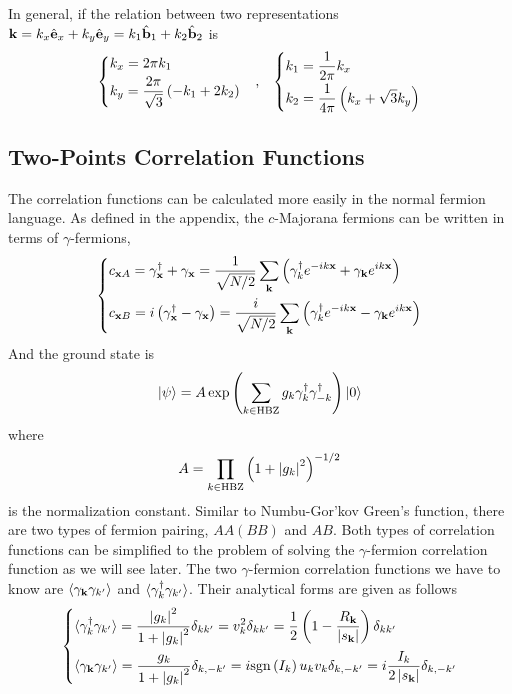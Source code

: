 In general, if the relation between two representations $\mathbf{k} = k_x\hat{\mathbf{e}}_x + k_y\hat{\mathbf{e}}_y = k_1\hat{\mathbf{b}}_1 + k_2\hat{\mathbf{b}}_2$ is
\[
\begin{array}{ccc}
    \left\{
    \begin{aligned}
        & k_x = 2\pi k_1 \\
        & k_y = \frac{2\pi}{\sqrt{3}}\left( -k_1 + 2k_2 \right)
    \end{aligned}
    \right.
    &  
    ,
    &
    \left\{
    \begin{aligned}
        & k_1 = \frac{1}{2\pi} k_x \\
        & k_2 = \frac{1}{4\pi}\left( k_x + \sqrt{3}k_y \right)
    \end{aligned}
    \right.
\end{array}
\]


\subsection{Two-Points Correlation Functions}
The correlation functions can be calculated more easily in the normal fermion language. As defined in the appendix, the $c$-Majorana fermions can be written in terms of $\gamma$-fermions,
\[
\left\{
\begin{aligned}
& c_{\mathbf{x}A} =  \gamma^\dagger_{\mathbf{x}} + \gamma_{\mathbf{x}} = \frac{1}{\sqrt{N/2}}\sum_{\mathbf{k}}\left( \gamma^\dagger_k e^{-ik\mathbf{x}} + \gamma_{\mathbf{k}} e^{ik\mathbf{x}} \right) \\
& c_{\mathbf{x}B} = i\left( \gamma^\dagger_{\mathbf{x}} - \gamma_{\mathbf{x}} \right) = \frac{i}{\sqrt{N/2}}\sum_{\mathbf{k}}\left( \gamma^\dagger_k e^{-ik\mathbf{x}} - \gamma_{\mathbf{k}} e^{ik\mathbf{x}} \right)
\end{aligned}
\right.
\]
And the ground state is 
\[
| \psi \rangle = A\exp\left( \sum_{k\in\mathrm{HBZ}}g_k\gamma^\dagger_k\gamma^\dagger_{-k} \right) | 0 \rangle
\]
where 
\[
A = \prod_{k\in\mathrm{HBZ}}\left( 1 + \left| g_k \right|^2 \right)^{-1/2}
\]
is the normalization constant. Similar to Numbu-Gor'kov Green's function, there are two types of fermion pairing, $AA(BB)$ and $AB$. Both types of correlation functions can be simplified to the problem of solving the $\gamma$-fermion correlation function as we will see later. The two $\gamma$-fermion correlation functions we have to know are $\langle \gamma_{\mathbf{k}}\gamma_{k'} \rangle$ and $\langle \gamma^\dagger_k\gamma_{k'} \rangle$. Their analytical forms are given as follows
\[
\left\{
\begin{aligned}
& \langle \gamma^\dagger_k \gamma_{k'} \rangle = \frac{\left| g_k \right|^2}{1+\left| g_k \right|^2}\delta_{kk'} = v_k^2\delta_{kk'} = \frac{1}{2}\left( 1-\frac{R_{\mathbf{k}}}{\left| s_{\mathbf{k}} \right|} \right)\delta_{kk'}\\
& \langle \gamma_{\mathbf{k}}\gamma_{k'} \rangle = \frac{g_k}{1+\left| g_k \right|^2}\delta_{k,-k'} = i\mathrm{sgn}\left( I_k \right)u_kv_k\delta_{k,-k'} = i\frac{I_k}{2\left| s_{\mathbf{k}} \right|}\delta_{k,-k'}
\end{aligned}
\right.
\]
